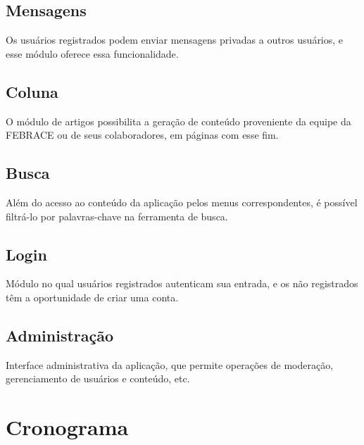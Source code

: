 \documentclass[a4paper,12pt,font=plain,header=plain]{abnt}
\begin{document}
    \subsection{Mensagens}
    Os usuários registrados podem enviar mensagens privadas a outros usuários, e esse módulo oferece essa funcionalidade.

    \subsection{Coluna}
    O módulo de artigos possibilita a geração de conteúdo proveniente da equipe da FEBRACE ou de seus colaboradores, em páginas com esse fim.

    \subsection{Busca}
    Além do acesso ao conteúdo da aplicação pelos menus correspondentes, é possível filtrá-lo por palavras-chave na ferramenta de busca.

    \subsection{Login}
    Módulo no qual usuários registrados autenticam sua entrada, e os não registrados têm a oportunidade de criar uma conta.

    \subsection{Administração}
    Interface administrativa da aplicação, que permite operações de moderação, gerenciamento de usuários e conteúdo, etc.

  \section{Cronograma}
\end{document}
